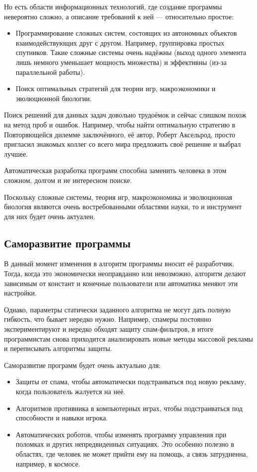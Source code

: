 \documentclass[utf8,a5paper,portrait,10pt,twoside]{eskdtext}
\begin{document}
Но есть области информационных технологий, где создание программы невероятно
сложно, а описание требований к ней — относительно простое:
\begin{itemize}
  \item Программирование сложных систем, состоящих из автономных объектов
        взаимодействующих друг с другом. Например, группировка простых
        спутников. Такие сложные системы очень надёжны (выход одного элемента
        лишь немного уменьшает мощность множества) и эффективны (из-за
        параллельной работы).
  \item Поиск оптимальных стратегий для теории игр, макроэкономики и
        эволюционной биологии.\cite{communication}
\end{itemize}

Поиск решений для данных задач довольно трудоёмок и сейчас слишком похож на
метод проб и ошибок. Например, чтобы найти оптимальную стратегию в Повторяющейся
дилемме заключённого, её автор, Роберт Аксельрод, просто пригласил знакомых
коллег со всего мира предложить своё решение и выбрал лучшее.\cite{dilemma}

Автоматическая разработка программ способна заменить человека в этом сложном,
долгом и не интересном поиске.

Поскольку сложные системы, теория игр, макроэкономика и эволюционная биология
являются очень востребованными областями науки, то и инструмент для них будет
очень актуален.

\subsection{Саморазвитие программы}

В данный момент изменения в алгоритм программы вносит её разработчик. Тогда,
когда это экономически неоправданно или невозможно, алгоритм делают зависимым
от констант и конечные пользователи или автоматика меняют эти настройки.

Однако, параметры статически заданного алгоритма не могут дать полную гибкость,
что бывает нередко нужно. Например, спамеры постоянно экспериментируют и нередко
обходят защиту спам-фильтров, в итоге программистам снова приходится
анализировать новые методы массовой рекламы и переписывать алгоритмы защиты.

Саморазвитие программ будет очень актуально для:
\begin{itemize}
  \item Защиты от спама, чтобы автоматически подстраиваться под новую рекламу,
        когда пользователь жалуется на неё.
  \item Алгоритмов противника в компьютерных играх, чтобы подстраиваться под
        способности и навыки игрока.
  \item Автоматических роботов, чтобы изменять программу управления при
        поломках и других непредвиденных ситуациях.\cite{damage} Это особенно
        полезно в областях, где человек не может прийти ему на помощь, а связь
        затрудненна, например, в космосе.
\end{itemize}
\end{document}
